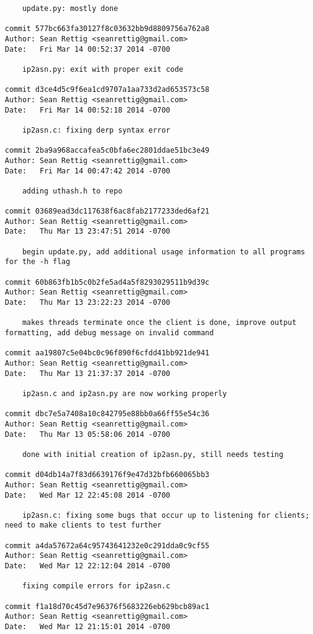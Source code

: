 \documentclass[letterpaper,10pt,fleqn]{article}
\numberwithin{equation}{section}
\begin{document}
\begin{verbatim}
    update.py: mostly done

commit 577bc663fa30127f8c03632bb9d8809756a762a8
Author: Sean Rettig <seanrettig@gmail.com>
Date:   Fri Mar 14 00:52:37 2014 -0700

    ip2asn.py: exit with proper exit code

commit d3ce4d5c9f6ea1cd9707a1aa733d2ad653573c58
Author: Sean Rettig <seanrettig@gmail.com>
Date:   Fri Mar 14 00:52:18 2014 -0700

    ip2asn.c: fixing derp syntax error

commit 2ba9a968accafea5c0bfa6ec2801ddae51bc3e49
Author: Sean Rettig <seanrettig@gmail.com>
Date:   Fri Mar 14 00:47:42 2014 -0700

    adding uthash.h to repo

commit 03689ead3dc117638f6ac8fab2177233ded6af21
Author: Sean Rettig <seanrettig@gmail.com>
Date:   Thu Mar 13 23:47:51 2014 -0700

    begin update.py, add additional usage information to all programs for the -h flag

commit 60b863fb1b5c0b2fe5ad4a5f8293029511b9d39c
Author: Sean Rettig <seanrettig@gmail.com>
Date:   Thu Mar 13 23:22:23 2014 -0700

    makes threads terminate once the client is done, improve output formatting, add debug message on invalid command

commit aa19807c5e04bc0c96f890f6cfdd41bb921de941
Author: Sean Rettig <seanrettig@gmail.com>
Date:   Thu Mar 13 21:37:37 2014 -0700

    ip2asn.c and ip2asn.py are now working properly

commit dbc7e5a7408a10c842795e88bb0a66ff55e54c36
Author: Sean Rettig <seanrettig@gmail.com>
Date:   Thu Mar 13 05:58:06 2014 -0700

    done with initial creation of ip2asn.py, still needs testing

commit d04db14a7f83d6639176f9e47d32bfb660065bb3
Author: Sean Rettig <seanrettig@gmail.com>
Date:   Wed Mar 12 22:45:08 2014 -0700

    ip2asn.c: fixing some bugs that occur up to listening for clients; need to make clients to test further

commit a4da57672a64c95743641232e0c291dda0c9cf55
Author: Sean Rettig <seanrettig@gmail.com>
Date:   Wed Mar 12 22:12:04 2014 -0700

    fixing compile errors for ip2asn.c

commit f1a18d70c45d7e96376f5683226eb629bcb89ac1
Author: Sean Rettig <seanrettig@gmail.com>
Date:   Wed Mar 12 21:15:01 2014 -0700


\end{verbatim}
\end{document}
